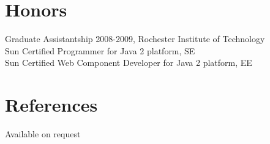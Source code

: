 \documentclass[margin]{res}
\begin{document}
\begin{resume}
\section{Honors}
Graduate Assistantship 2008-2009, Rochester Institute of Technology\\
Sun Certified Programmer for Java 2 platform, SE\\
Sun Certified Web Component Developer for Java 2 platform, EE

\section{References}
Available on request
\end{resume} 
\end{document}
